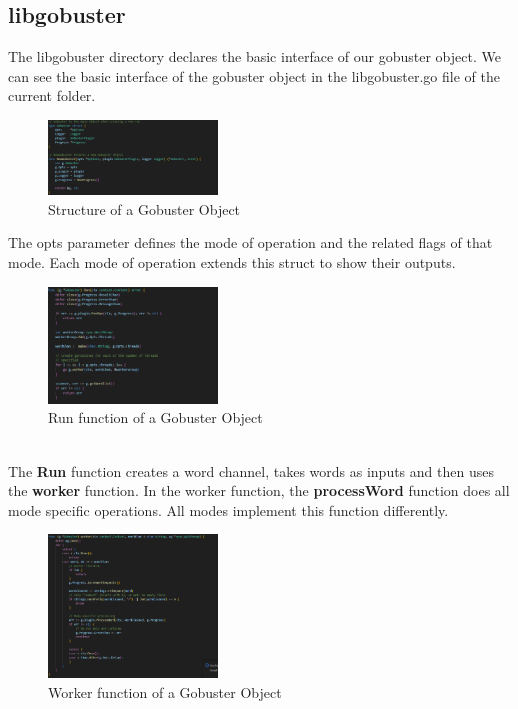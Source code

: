 \documentclass[12 pt]{article}
\begin{document}
\subsection{libgobuster}
The libgobuster directory declares the basic interface of our gobuster object. We can see the basic interface of the gobuster object in the libgobuster.go file of the current folder.
\begin{figure}[H]
    \centering
    \includegraphics[width=0.4\textwidth]{Gobuster_struct.png}
    \caption{Structure of a Gobuster Object}
    \label{fig: Gobuster struct}
\end{figure}
The opts parameter defines the mode of operation and the related flags of that mode. Each mode of operation extends this struct to show their outputs.\\
\begin{figure}[H]
    \centering
    \includegraphics[width=0.4\textwidth]{Libgobuster_Run.png}
    \caption{Run function of a Gobuster Object}
    \label{fig: Libgobuster Run}
\end{figure} \\
The \textbf{Run} function creates a word channel, takes words as inputs and then uses the \textbf{worker} function. In the worker function, the \textbf{processWord} function does all mode specific operations. All modes implement this function differently.\\
\begin{figure}[H]
    \centering
    \includegraphics[width=0.4\textwidth]{Libgobuster_Worker.png}
    \caption{Worker function of a Gobuster Object}
    \label{fig: Libgobuster Worker}
\end{figure} \\
\end{document}
